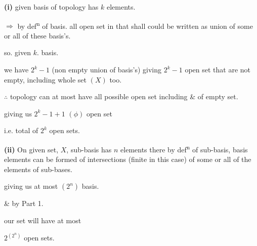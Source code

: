 \documentclass{article}
\begin{document}
\noindent\textbf{(i)} given basis of topology has $k$ elements.

$\Rightarrow$ by def\textsuperscript{n} of basis. all open set in that shall could be written as union of some or all of these basis's.

so. given $k$. basis.

\quad we have $2^k - 1$ (non empty union of basis's) giving $2^k - 1$ open set that are not empty, including whole set $(X)$ too.

$\therefore$ topology can at most have all possible open set including \& of empty set.

\quad giving us $2^k - 1 + 1$ $(\phi)$ open set

\quad i.e. total of $2^k$ open sets.

\vspace{1em}

\noindent\textbf{(ii)} On given set, $X$, sub-basis has $n$ elements there by def\textsuperscript{n} of sub-basis, basis elements can be formed of intersections (finite in this case) of some or all of the elements of sub-bases.

\quad giving us at most $(2^n)$ basis.

\& by Part 1.

\quad our set will have at most

\quad $2^{(2^n)}$ open sets.
\end{document}
